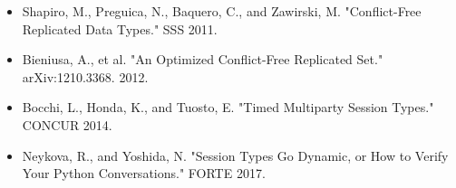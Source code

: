 \documentclass[11pt]{article}
\begin{document}
\begin{itemize}
\item Shapiro, M., Preguica, N., Baquero, C., and Zawirski, M. "Conflict-Free
Replicated Data Types." SSS 2011.

\item Bieniusa, A., et al. "An Optimized Conflict-Free Replicated Set."
arXiv:1210.3368. 2012.

\item Bocchi, L., Honda, K., and Tuosto, E. "Timed Multiparty Session Types."
CONCUR 2014.

\item Neykova, R., and Yoshida, N. "Session Types Go Dynamic, or How to Verify
Your Python Conversations." FORTE 2017.
\end{itemize}
\end{document}
